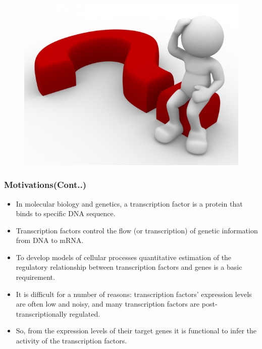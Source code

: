 \documentclass{beamer}
\begin{document}
\begin{frame}
\begin{figure}
\includegraphics[width=0.4\linewidth]{diagrams/question.png}
\end{figure}
\end{frame}



\begin{frame}
\frametitle{Motivations(Cont..)}
\begin{itemize}

\item In molecular biology and genetics, a transcription factor is a protein that binds to specific DNA sequence.
\item Transcription factors {\color{blue} control the flow} (or transcription) of genetic information from {\color{blue} DNA to mRNA}. 
\item To develop models of {\color{blue} cellular processes} quantitative estimation of the regulatory relationship between transcription factors and genes is a {\color{blue}basic requirement}. 
\item It is difficult for a number of reasons: transcription factors’ expression levels are often {\color{red} low and noisy}, and many transcription factors are {\color{red}post- transcriptionally regulated}. 
\item So, from the expression levels of their target genes it is functional to infer the activity of the transcription factors.

\end{itemize}
\end{frame}
\end{document}
